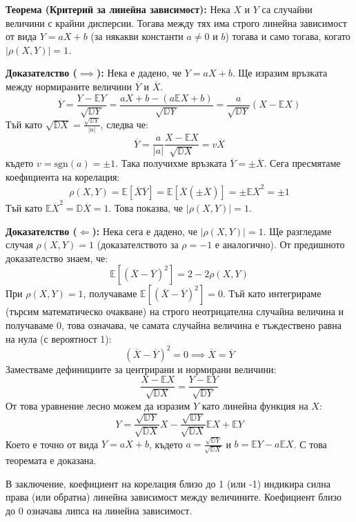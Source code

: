 \documentclass{article}
\begin{document}
\textbf{Теорема (Критерий за линейна зависимост):} Нека $X$ и $Y$ са случайни величини с крайни дисперсии. Тогава между тях има строго линейна зависимост от вида $Y = aX + b$ (за някакви константи $a \neq 0$ и $b$) тогава и само тогава, когато $|\rho(X, Y)| = 1$.

\textbf{Доказателство ($\implies$):} 
Нека е дадено, че $Y = aX + b$. Ще изразим връзката между нормираните величини $\overline{Y}$ и $\overline{X}$. 
\[
\overline{Y} = \frac{Y - \mathbb{E}Y}{\sqrt{\mathbb{D}Y}} = \frac{aX + b - (a\mathbb{E}X + b)}{\sqrt{\mathbb{D}Y}} = \frac{a}{\sqrt{\mathbb{D}Y}}(X - \mathbb{E}X)
\]
Тъй като $\sqrt{\mathbb{D}X} = \frac{\sqrt{\mathbb{D}Y}}{|a|}$, следва че:
\[
\overline{Y} = \frac{a}{|a|} \frac{X - \mathbb{E}X}{\sqrt{\mathbb{D}X}} = v \overline{X}
\]
където $v = \text{sgn}(a) = \pm 1$. Така получихме връзката $\overline{Y} = \pm \overline{X}$.
Сега пресмятаме коефициента на корелация:
\[
\rho(X, Y) = \mathbb{E}[\overline{X}\overline{Y}] = \mathbb{E}[\overline{X}(\pm \overline{X})] = \pm \mathbb{E}\overline{X}^2 = \pm 1
\]
Тъй като $\mathbb{E}\overline{X}^2 = \mathbb{D}\overline{X} = 1$. Това показва, че $|\rho(X, Y)| = 1$.

\textbf{Доказателство ($\Longleftarrow$):}
Нека сега е дадено, че $|\rho(X, Y)| = 1$. Ще разгледаме случая $\rho(X, Y) = 1$ (доказателството за $\rho = -1$ е аналогично).
От предишното доказателство знаем, че:
\[
\mathbb{E}[(\overline{X} - \overline{Y})^2] = 2 - 2\rho(X, Y)
\]
При $\rho(X, Y) = 1$, получаваме $\mathbb{E}[(\overline{X} - \overline{Y})^2] = 0$.
Тъй като интегрираме (търсим математическо очакване) на строго неотрицателна случайна величина и получаваме 0, това означава, че самата случайна величина е тъждествено равна на нула (с вероятност 1):
\[
(\overline{X} - \overline{Y})^2 = 0 \implies \overline{X} = \overline{Y}
\]
Заместваме дефинициите за центрирани и нормирани величини:
\[
\frac{X - \mathbb{E}X}{\sqrt{\mathbb{D}X}} = \frac{Y - \mathbb{E}Y}{\sqrt{\mathbb{D}Y}}
\]
От това уравнение лесно можем да изразим $Y$ като линейна функция на $X$:
\[
Y = \frac{\sqrt{\mathbb{D}Y}}{\sqrt{\mathbb{D}X}} X - \frac{\sqrt{\mathbb{D}Y}}{\sqrt{\mathbb{D}X}} \mathbb{E}X + \mathbb{E}Y
\]
Което е точно от вида $Y = aX + b$, където $a = \frac{\sqrt{\mathbb{D}Y}}{\sqrt{\mathbb{D}X}}$ и $b = \mathbb{E}Y - a\mathbb{E}X$. С това теоремата е доказана.

В заключение, коефициент на корелация близо до 1 (или -1) индикира силна права (или обратна) линейна зависимост между величините. Коефициент близо до 0 означава липса на линейна зависимост.
\end{document}

